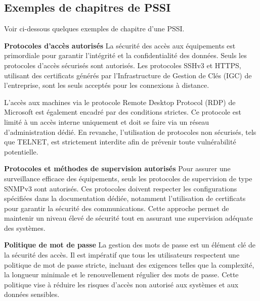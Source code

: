 \subsection{Exemples de chapitres de PSSI}

Voir ci-dessous quelques exemples de chapitre d'une PSSI.

\textbf{Protocoles d’accès autorisés}
La sécurité des accès aux équipements est primordiale pour garantir l'intégrité et la confidentialité des données. Seuls les protocoles d'accès sécurisés sont autorisés. Les protocoles SSHv3 et HTTPS, utilisant des certificats générés par l'Infrastructure de Gestion de Clés (IGC) de l'entreprise, sont les seuls acceptés pour les connexions à distance.

L'accès aux machines via le protocole Remote Desktop Protocol (RDP) de Microsoft est également encadré par des conditions strictes. Ce protocole est limité à un accès interne uniquement et doit se faire via un réseau d'administration dédié. En revanche, l'utilisation de protocoles non sécurisés, tels que TELNET, est strictement interdite afin de prévenir toute vulnérabilité potentielle.

\textbf{Protocoles et méthodes de supervision autorisés}
Pour assurer une surveillance efficace des équipements, seuls les protocoles de supervision de type SNMPv3 sont autorisés. Ces protocoles doivent respecter les configurations spécifiées dans la documentation dédiée, notamment l'utilisation de certificats pour garantir la sécurité des communications. Cette approche permet de maintenir un niveau élevé de sécurité tout en assurant une supervision adéquate des systèmes.

\textbf{Politique de mot de passe}
La gestion des mots de passe est un élément clé de la sécurité des accès. Il est impératif que tous les utilisateurs respectent une politique de mot de passe stricte, incluant des exigences telles que la complexité, la longueur minimale et le renouvellement régulier des mots de passe. Cette politique vise à réduire les risques d'accès non autorisé aux systèmes et aux données sensibles.

